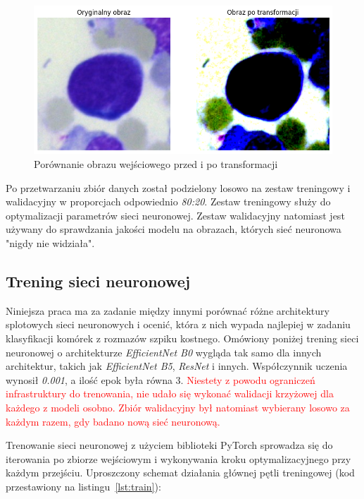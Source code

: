 \begin{figure}
    \centering
    \includegraphics[width=\textwidth]{image_transform}
    \caption{Porównanie obrazu wejściowego przed i po transformacji}
    \label{fig:transformations_example}
\end{figure}

Po przetwarzaniu zbiór danych został podzielony losowo na zestaw treningowy i walidacyjny w proporcjach odpowiednio \textit{80:20}.
Zestaw treningowy służy do optymalizacji parametrów sieci neuronowej.
Zestaw walidacyjny natomiast jest używany do sprawdzania jakości modelu na obrazach, których sieć neuronowa "nigdy nie widziała".

\subsection{Trening sieci neuronowej}

Niniejsza praca ma za zadanie między innymi porównać różne architektury splotowych sieci neuronowych i ocenić,
która z nich wypada najlepiej w zadaniu klasyfikacji komórek z rozmazów szpiku kostnego.
Omówiony poniżej trening sieci neuronowej o architekturze \textit{EfficientNet B0} wygląda tak samo dla innych architektur, takich jak \textit{EfficientNet B5}, \textit{ResNet} i innych.
Współczynnik uczenia wynosił \textit{0.001}, a ilość epok była równa 3.
\textcolor{red}{Niestety z powodu ograniczeń infrastruktury do trenowania, nie udało się wykonać walidacji krzyżowej dla każdego z modeli osobno. Zbiór walidacyjny był natomiast wybierany losowo za każdym razem, gdy badano nową sieć neuronową.}

Trenowanie sieci neuronowej z użyciem biblioteki PyTorch sprowadza się do iterowania po zbiorze wejściowym i wykonywania kroku optymalizacyjnego przy każdym przejściu.
Uproszczony schemat działania głównej pętli treningowej (kod przestawiony na listingu~\ref{lst:train}):

